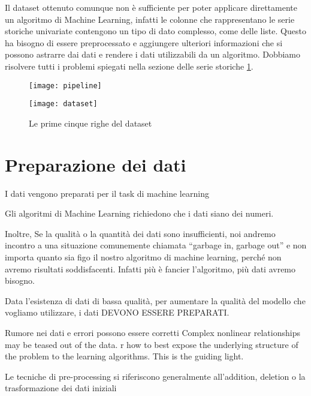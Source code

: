 Il dataset ottenuto comunque non è sufficiente per poter applicare
direttamente un algoritmo di Machine Learning, infatti le colonne che
rappresentano le serie storiche univariate contengono un tipo di dato
complesso, come delle liste. Questo ha bisogno di essere preprocessato e
aggiungere ulteriori informazioni che si possono astrarre dai dati e rendere i
dati utilizzabili da un algoritmo. Dobbiamo risolvere tutti i problemi
spiegati nella sezione delle serie storiche \ref{}.


\begin{figure}
    \texttt{[image: pipeline]}
    \caption{}
    \label{}
\end{figure}

\begin{figure}[!ht]
    \centering
    \texttt{[image: dataset]}
    \caption{Le prime cinque righe del dataset}
    \label{fig:dataset_from_join_hj_htjob}
\end{figure}

\section{Preparazione dei dati} %


I dati vengono preparati per il task di machine learning

Gli algoritmi di Machine Learning richiedono che i dati siano dei numeri.

Inoltre,
Se la qualità o la quantità dei dati sono insufficienti, noi andremo incontro
a una situazione comunemente chiamata ``garbage in, garbage out'' e non
importa quanto sia figo il nostro algoritmo di machine learning, perché non
avremo risultati soddisfacenti. Infatti più è fancier l'algoritmo, più dati
avremo bisogno.

Data l'esistenza di dati di bassa qualità, per aumentare la qualità del
modello che vogliamo utilizzare, i dati DEVONO ESSERE PREPARATI.

Rumore nei dati e errori possono essere corretti
Complex nonlinear relationships may be teased out of the data.
 r how to best expose the underlying structure of the problem to the learning algorithms. This is the guiding light.

Le tecniche di pre-processing si riferiscono generalmente all'addition,
deletion o la trasformazione dei dati iniziali 

